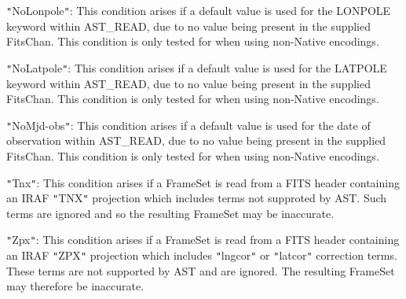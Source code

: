 \documentclass[twoside,11pt]{article}
\begin{document}
{{{         \sstitem
         {\tt{"}}NoLonpole{\tt{"}}: This condition arises if a default value is used for
         the LONPOLE keyword within AST\_READ, due to no value being present
         in the supplied FitsChan. This condition is only tested for when
         using non-Native encodings.

         \sstitem
         {\tt{"}}NoLatpole{\tt{"}}: This condition arises if a default value is used for
         the LATPOLE keyword within AST\_READ, due to no value being present
         in the supplied FitsChan. This condition is only tested for when
         using non-Native encodings.

         \sstitem
         {\tt{"}}NoMjd-obs{\tt{"}}: This condition arises if a default value is used for
         the date of observation within AST\_READ, due to no value being present
         in the supplied FitsChan. This condition is only tested for when using
         non-Native encodings.

         \sstitem
         {\tt{"}}Tnx{\tt{"}}: This condition arises if a FrameSet is read from a FITS
         header containing an IRAF {\tt{"}}TNX{\tt{"}} projection which includes terms
         not supproted by AST. Such terms are ignored and so the resulting
         FrameSet may be inaccurate.

         \sstitem
         {\tt{"}}Zpx{\tt{"}}: This condition arises if a FrameSet is read from a FITS
         header containing an IRAF {\tt{"}}ZPX{\tt{"}} projection which includes {\tt{"}}lngcor{\tt{"}}
         or {\tt{"}}latcor{\tt{"}} correction terms. These terms are not supported by AST
         and are ignored. The resulting FrameSet may therefore be inaccurate.
      }
   }
}
\end{document}
